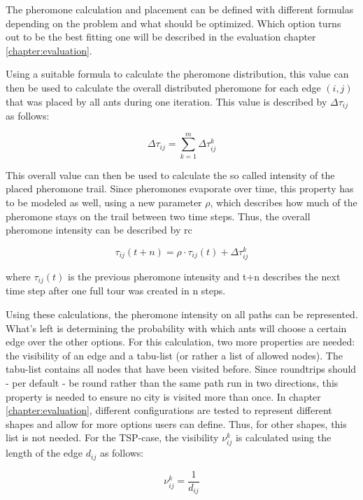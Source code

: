 The pheromone calculation and placement can be defined with different formulas depending on the problem and what should be optimized. 
Which option turns out to be the best fitting one will be described in the evaluation chapter \ref{chapter:evaluation}.


Using a suitable formula to calculate the pheromone distribution, this value can then be used to calculate the overall distributed pheromone for each edge $(i,j)$ that was placed by all ants during one iteration.
This value is described by $\Delta\tau_{ij}$ as follows:

\begin{equation}\label{eq:deltaTau}
	\Delta\tau_{ij} = \sum_{k=1}^{m} \Delta\tau_{ij}^k 
\end{equation}

This overall value can then be used to calculate the so called \glqq intensity\grqq{} of the placed pheromone trail.
Since pheromones evaporate over time, this property has to be modeled as well, using a new parameter $\rho$, which describes how much of the pheromone stays on the trail between two time steps.
Thus, the overall pheromone intensity can be described by
rc

\begin{equation}\label{eq:trailIntensity}
	\tau_{ij}(t+n) = \rho \cdot \tau_{ij}(t)+\Delta\tau_{ij}^k 
\end{equation}

where $\tau_{ij}(t)$ is the previous pheromone intensity and t+n describes the next time step after one full tour was created in n steps.

Using these calculations, the pheromone intensity on all paths can be represented. 
What's left is determining the probability with which ants will choose a certain edge over the other options.
For this calculation, two more properties are needed: the visibility of an edge and a tabu-list (or rather a list of allowed nodes).
The tabu-list contains all nodes that have been visited before.
Since roundtrips should - per default - be round rather than the same path run in two directions, this property is needed to ensure no city is visited more than once.
In chapter \ref{chapter:evaluation}, different configurations are tested to represent different shapes and allow for more options users can define. 
Thus, for other shapes, this list is not needed.
For the TSP-case, the visibility $\nu_{ij}^k$ is calculated using the length of the edge $d_{ij}$ as follows:

\begin{equation}\label{eq:visibility}
	\nu_{ij}^k = \frac{1}{d_{ij}}
\end{equation}

